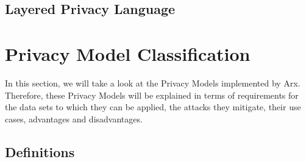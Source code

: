 \documentclass[12pt, a4paper,oneside]{report}
\begin{document}
\section{Layered Privacy Language}

\chapter{Privacy Model Classification}\label{class}
In this section, we will take a look at the Privacy Models implemented by Arx. Therefore, these Privacy Models will be explained in terms of requirements for the data sets to which they can be applied, the attacks they mitigate, their use cases, advantages and disadvantages.

\section{Definitions}
\end{document}
